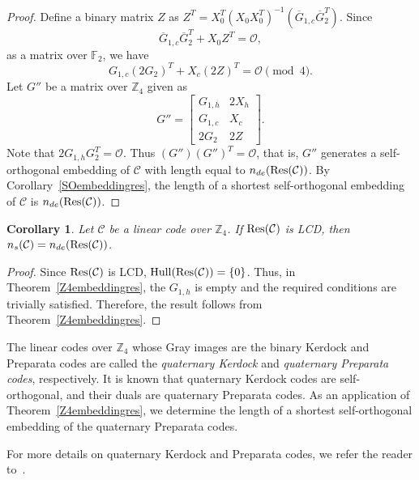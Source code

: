 \documentclass{article}
\newtheorem{corollary}[theorem]{Corollary}
\theoremstyle{definition}
\theoremstyle{remark}
\begin{document}
\begin{proof}
    Define a binary matrix $Z$ as $Z^T=X_0^T(X_0X_0^T)^{-1}(\overline{G}_{1, c}\overline{G}_2^T)$. Since
    \[
    \overline{G}_{1, c}\overline{G}_2^T+X_0Z^T=\mathcal{O},
    \]
    as a matrix over $\mathbb{F}_2$, we have
    \[
    G_{1, c}(2G_2)^T+X_c(2Z)^T=\mathcal{O}\pmod 4.
    \]
    Let $G''$ be a matrix over $\mathbb{Z}_4$ given as
    \[
    G''=\begin{bmatrix}
        G_{1, h} & 2X_h\\G_{1, c} & X_c\\2G_2 & 2Z
    \end{bmatrix}.
    \]
    Note that $2G_{1, h}G_2^T=\mathcal{O}$. Thus $(G'')(G'')^T=\mathcal{O}$, that is, $G''$ generates a self-orthogonal embedding of $\mathcal{C}$ with length equal to $n_{de}({\rm Res}(\mathcal{C}))$. By Corollary~\ref{SOembeddingres}, the length of a shortest self-orthogonal embedding of $\mathcal{C}$ is $n_{de}({\rm Res}(\mathcal{C}))$.
\end{proof}

\begin{corollary}
    Let $\mathcal{C}$ be a linear code over $\mathbb{Z}_4$. If ${\rm{Res}}(\mathcal{C})$ is LCD, then $n_s(\mathcal{C})=n_{de}({\rm Res}(\mathcal{C}))$.
\end{corollary}
\begin{proof}
Since ${\rm Res}(\mathcal C)$ is LCD, ${\rm Hull}({\rm Res}(\mathcal C))=\{0\}$. Thus, in Theorem~\ref{Z4embeddingres}, the $G_{1,h}$ is empty and the required conditions are trivially satisfied. Therefore, the result follows from Theorem~\ref{Z4embeddingres}.
\end{proof}

The linear codes over $\mathbb{Z}_4$ whose Gray images are the binary Kerdock and Preparata codes are called the \textit{quaternary Kerdock} and \textit{quaternary Preparata codes}, respectively. It is known that quaternary Kerdock codes are self-orthogonal, and their duals are quaternary Preparata codes. As an application of Theorem~\ref{Z4embeddingres}, we determine the length of a shortest self-orthogonal embedding of the quaternary Preparata codes.

For more details on quaternary Kerdock and Preparata codes, we refer the reader to~\cite{book-HP,book-W}.
\end{document}
